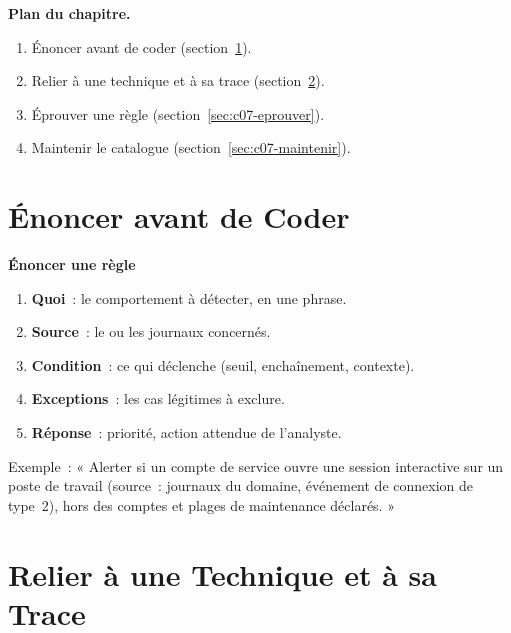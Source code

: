\medskip
\textbf{Plan du chapitre.}
\begin{enumerate}
    \item Énoncer avant de coder (section~\ref{sec:c07-enoncer}).
    \item Relier à une technique et à sa trace (section~\ref{sec:c07-attack}).
    \item Éprouver une règle (section~\ref{sec:c07-eprouver}).
    \item Maintenir le catalogue (section~\ref{sec:c07-maintenir}).
\end{enumerate}

\separateur

\section{Énoncer avant de Coder}
\label{sec:c07-enoncer}

\begin{boxprocedure}
\textbf{Énoncer une règle}
\begin{enumerate}
    \item \textbf{Quoi}~: le comportement à détecter, en une phrase.
    \item \textbf{Source}~: le ou les journaux concernés.
    \item \textbf{Condition}~: ce qui déclenche (seuil, enchaînement, contexte).
    \item \textbf{Exceptions}~: les cas légitimes à exclure.
    \item \textbf{Réponse}~: priorité, action attendue de l'analyste.
\end{enumerate}
\end{boxprocedure}

Exemple~: « Alerter si un compte de service ouvre une session interactive sur
un poste de travail (source~: journaux du domaine, événement de connexion de
type~2), hors des comptes et plages de maintenance déclarés. »

\section{Relier à une Technique et à sa Trace}
\label{sec:c07-attack}

